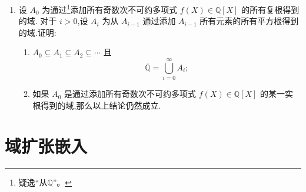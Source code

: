 \begin{enumerate}
\item 设 $ A_0 $ 为通过\footnote{疑逸``从$\mathbb{Q}$''。}添加所有奇数次不可约多项式 $ f(X) \in \mathbb{Q}[X] $ 的所有复根得到的域.
对于 $ i > 0 $,设 $ A_i $ 为从 $ A_{i-1} $ 通过添加 $ A_{i-1} $ 所有元素的所有平方根得到的域.证明:\printfootnotes
\begin{enumerate}[label=(\arabic*)]
    \item $ A_0 \subseteq A_1 \subseteq A_2 \subseteq \cdots $ 且
    \[
    \overline{\mathbb{Q}} = \bigcup_{i=0}^{\infty} A_i;
    \]
    \item 如果 $ A_0 $ 是通过添加所有奇数次不可约多项式 $ f(X) \in \mathbb{Q}[X] $ 的某一实根得到的域,那么以上结论仍然成立.
\end{enumerate}
\end{enumerate}

\section{域扩张嵌入}

